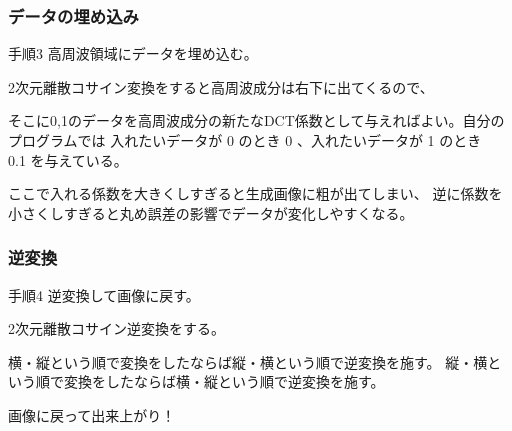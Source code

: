 \documentclass[dvipdfmx,11pt,notheorems]{beamer}
\theoremstyle{definition}
\begin{document}
\begin{frame}\frametitle{データの埋め込み}
	\begin{block}{手順3}
		高周波領域にデータを埋め込む。
	\end{block}
	2次元離散コサイン変換をすると高周波成分は右下に出てくるので、

	そこに0,1のデータを高周波成分の新たなDCT係数として与えればよい。自分のプログラムでは
	入れたいデータが 0 のとき 0 、入れたいデータが 1 のとき　0.1 を与えている。

	ここで入れる係数を大きくしすぎると生成画像に粗が出てしまい、
	逆に係数を小さくしすぎると丸め誤差の影響でデータが変化しやすくなる。
\end{frame}

\begin{frame}\frametitle{逆変換}
	\begin{block}{手順4}
		逆変換して画像に戻す。
	\end{block}
	2次元離散コサイン逆変換をする。

	横・縦という順で変換をしたならば縦・横という順で逆変換を施す。
	縦・横という順で変換をしたならば横・縦という順で逆変換を施す。

	画像に戻って出来上がり！
\end{frame}
\end{document}
